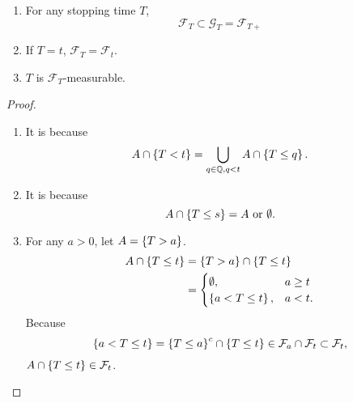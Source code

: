 \begin{prop}
    \begin{enumerate}[label=(\arabic{*})]
        \item For any stopping time $T$,
        \begin{equation*}
            \mathcal{F}_T \subset \mathcal{G}_T = \mathcal{F}_{T+}
        \end{equation*}

        \item If $T = t$, $\mathcal{F}_T = \mathcal{F}_t$.

        \item $T$ is $\mathcal{F}_T$-measurable.
    \end{enumerate}
\end{prop}
\begin{proof}
    \begin{enumerate}[label=(\arabic{*})]
        \item It is because
        \begin{equation*}
             A \cap \left\{T < t\right\} = \bigcup_{q \in \mathbb{Q},q < t} A \cap \left\{T \leq q\right\}.
        \end{equation*}

        \item It is because
        \begin{equation*}
            A \cap \left\{T \leq s\right\} = A \text{ or } \emptyset.
        \end{equation*}

        \item For any $a > 0$, let $A = \left\{T > a\right\}$.
        \begin{align*}
            A \cap \left\{T \leq t\right\} &= \left\{T > a\right\} \cap \left\{T \leq t\right\} \\
            &= \begin{cases}
                \emptyset,& a \geq t \\
                \left\{a < T \leq t\right\},&a<t.
            \end{cases}
        \end{align*}
        Because
        \begin{equation*}
            \left\{a < T \leq t\right\} = \left\{T \leq a\right\}^c \cap \left\{T \leq t\right\} \in \mathcal{F}_a \cap \mathcal{F}_t \subset \mathcal{F}_t,
        \end{equation*}
        $A \cap \left\{T \leq t\right\} \in \mathcal{F}_t$.  \qedhere
    \end{enumerate}
\end{proof}


